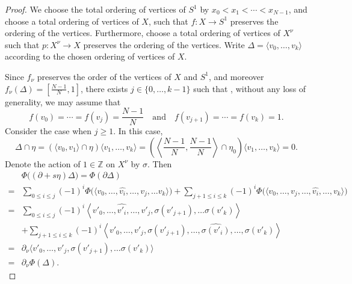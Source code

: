 \documentclass[12pt,leqno,twoside]{amsart}
\theoremstyle{plain}
\theoremstyle{definition}
\newcommand{\Z}{\mathbb{Z}}
\begin{document}
\begin{proof}
We choose the total ordering of vertices of $S^1$ by $x_0<x_1<\cdots <x_{N-1}$, and choose a total ordering of vertices of $X$, such that $f\colon X\to S^1$ preserves the ordering of the vertices. Furthermore, choose a total ordering of vertices of $X^\nu$ such that $p\colon X^\nu\to X$ preserves the ordering of the vertices. Write $\Delta=\langle v_0, \ldots, v_k\rangle$ according to the chosen ordering of vertices of $X$. 
 
Since $f_\nu$ preserves the order of the vertices of $X$ and $S^1$, and moreover $f_\nu(\Delta)=[\frac{N-1}{N}, 1]$, there exists $j\in \{0, \ldots, k-1\}$ such that ,
without any loss of generality, we may assume that
\[
f(v_0)=\cdots=f(v_j)=\frac{N-1}{N}\quad \text{and}\quad f(v_{j+1})=\cdots=f(v_k)=1.
\]
Consider the case when $j\geq 1$. In this case, 
\[
\Delta\cap \eta=(\langle v_0, v_1\rangle\cap \eta)\langle v_1, \dots, v_k\rangle=\left(\left\langle \frac{N-1}{N}, \frac{N-1}{N}\right\rangle\cap \eta_0\right)\langle v_1, \dots, v_k\rangle=0.
\]
Denote the action of $1\in \Z$ on $X^{\nu}$ by $\sigma$. Then
\begin{align*}
&\Phi\big((\partial+s\eta)\Delta\big)=\Phi(\partial\Delta)\\
=&\sum_{0\leq i\leq j}(-1)^i\Phi\big(\langle v_0, \ldots, \widehat{v_i}, \ldots, v_j, \ldots v_k\rangle\big)+\sum_{j+1\leq i\leq k}(-1)^i\Phi\big(\langle v_0, \ldots, v_j, \ldots, \widehat{v_i}, \ldots, v_k\rangle\big)\\
=&\sum_{0\leq i\leq j}(-1)^i\left\langle v'_0, \ldots, \widehat{v'_i}, \ldots, v'_j, \sigma(v'_{j+1}), \ldots \sigma(v'_k)\right\rangle\\
&+\sum_{j+1\leq i\leq k}(-1)^i\left\langle v'_0, \ldots, v'_j, \sigma(v'_{j+1}), \ldots, \widehat{\sigma(v'_i)}, \ldots, \sigma(v'_k)\right\rangle\\
=&\partial_\nu\langle v'_0, \ldots, v'_j, \sigma(v'_{j+1}), \ldots \sigma(v'_k)\rangle\\
=&\partial_\nu\Phi(\Delta).
\end{align*}


\end{proof}
\end{document}
